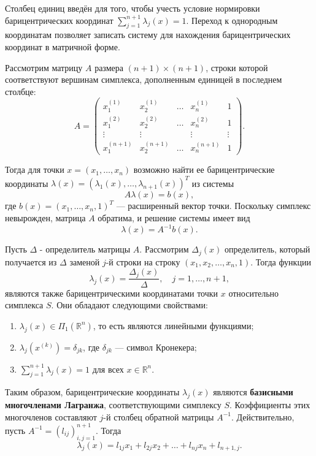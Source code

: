 \documentclass[a4paper,12pt]{article}
\theoremstyle{indented}
\begin{document}
Столбец единиц введён для того, чтобы учесть условие нормировки барицентрических координат $\sum_{j=1}^{n+1} \lambda_j(x) = 1$. Переход к однородным координатам позволяет записать систему для нахождения барицентрических координат в матричной форме.
\par
Рассмотрим матрицу $A$ размера $(n+1) \times (n+1)$, строки которой соответствуют вершинам симплекса, дополненным единицей в последнем столбце:
\[
A = \begin{pmatrix}
x_1^{(1)} & x_2^{(1)} & \dots & x_n^{(1)} & 1 \\
x_1^{(2)} & x_2^{(2)} & \dots & x_n^{(2)} & 1 \\
\vdots & \vdots & & \vdots & \vdots \\
x_1^{(n+1)} & x_2^{(n+1)} & \dots & x_n^{(n+1)} & 1
\end{pmatrix}.
\]
\par
Тогда для точки $x = (x_1, \dots, x_n)$ возможно найти ее барицентрические координаты $\lambda(x) = (\lambda_1(x), \dots, \lambda_{n+1}(x))^T$ из системы
\[
A \lambda(x) = b(x),
\]
где $b(x) = (x_1, \dots, x_n, 1)^T$ — расширенный вектор точки. Поскольку симплекс невырожден, матрица $A$ обратима, и решение системы имеет вид
\[
\lambda(x) = A^{-1} b(x).
\]
\par
Пусть $\Delta$ - определитель матрицы $A$. Рассмотрим $\Delta_j(x)$ определитель, который получается из $\Delta$ заменой $j$-й строки на строку $(x_1, x_2, \dots, x_n, 1)$. Тогда функции
\[
\lambda_j(x) = \frac{\Delta_j(x)}{\Delta}, \quad j = 1, \dots, n+1,
\]
являются также барицентрическими координатами точки $x$ относительно симплекса $S$. Они обладают следующими свойствами:
\begin{enumerate}
    \item $\lambda_j(x) \in \Pi_1(\mathbb{R}^n)$, то есть являются линейными функциями;
    \item $\lambda_j(x^{(k)}) = \delta_{jk}$, где $\delta_{jk}$ — символ Кронекера;
    \item $\sum_{j=1}^{n+1} \lambda_j(x) = 1$ для всех $x \in \mathbb{R}^n$.
\end{enumerate}

Таким образом, барицентрические координаты $\lambda_j(x)$ являются \textbf{базисными многочленами Лагранжа}, соответствующими симплексу $S$. Коэффициенты этих многочленов составляют $j$-й столбец обратной матрицы $A^{-1}$. Действительно, пусть $A^{-1} = (l_{ij})_{i,j=1}^{n+1}$. Тогда
\[
\lambda_j(x) = l_{1j} x_1 + l_{2j} x_2 + \dots + l_{nj} x_n + l_{n+1,j}.
\]
\end{document}
